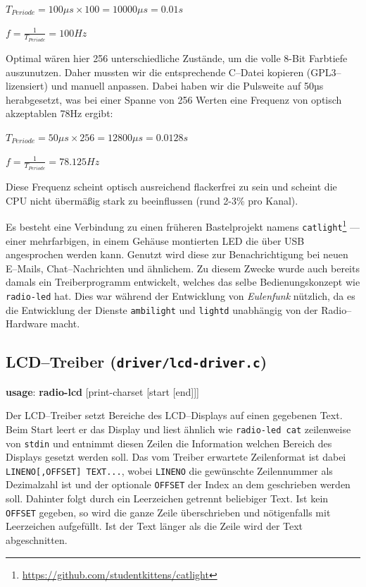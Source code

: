 \documentclass[11pt,ngerman,toc=listof,index=totoc]{scrreprt}
\newenvironment{Shaded}{}{}
\newcommand{\KeywordTok}[1]{\textcolor[rgb]{0.00,0.44,0.13}{\textbf{{#1}}}}
\newcommand{\NormalTok}[1]{{#1}}
\begin{document}
\(T_{Periode} = 100\mu s\times 100= 10000\mu s = 0.01s\)

\(f = \frac{1}{T_{Periode}} = 100Hz\)

Optimal wären hier 256 unterschiedliche Zustände, um die volle 8-Bit
Farbtiefe auszunutzen. Daher mussten wir die entsprechende C--Datei
kopieren (GPL3--lizensiert) und manuell anpassen. Dabei haben wir die
Pulsweite auf 50µs herabgesetzt, was bei einer Spanne von 256 Werten
eine Frequenz von optisch akzeptablen 78Hz ergibt:

\(T_{Periode} = 50\mu s\times 256 = 12800\mu s = 0.0128s\)

\(f = \frac{1}{T_{Periode}} = 78.125Hz\)

Diese Frequenz scheint optisch ausreichend flackerfrei zu sein und
scheint die CPU nicht übermäßig stark zu beeinflussen (rund 2-3\% pro
Kanal).

Es besteht eine Verbindung zu einen früheren Bastelprojekt namens
\texttt{catlight}\footnote{\url{https://github.com/studentkittens/catlight}}
--- einer mehrfarbigen, in einem Gehäuse montierten LED die über USB
angesprochen werden kann. Genutzt wird diese zur Benachrichtigung bei
neuen E--Mails, Chat--Nachrichten und ähnlichem. Zu diesem Zwecke wurde
auch bereits damals ein Treiberprogramm entwickelt, welches das selbe
Bedienungskonzept wie \texttt{radio-led} hat. Dies war während der
Entwicklung von \emph{Eulenfunk} nützlich, da es die Entwicklung der
Dienste \texttt{ambilight} und \texttt{lightd} unabhängig von der
Radio--Hardware macht.

\subsection{\texorpdfstring{LCD--Treiber
(\texttt{driver/lcd-driver.c})}{LCD--Treiber (driver/lcd-driver.c)}}\label{lcdtreiber-driverlcd-driver.c}

\begin{Shaded}
\begin{Highlighting}[]
\KeywordTok{usage}\NormalTok{:}
  \KeywordTok{radio-lcd} \NormalTok{[print-charset [start [end]]]}
\end{Highlighting}
\end{Shaded}

Der LCD--Treiber setzt Bereiche des LCD--Displays auf einen gegebenen
Text. Beim Start leert er das Display und liest ähnlich wie
\texttt{radio-led\ cat} zeilenweise von \texttt{stdin} und entnimmt
diesen Zeilen die Information welchen Bereich des Displays gesetzt
werden soll. Das vom Treiber erwartete Zeilenformat ist dabei
\texttt{LINENO{[},OFFSET{]}\ TEXT...}, wobei \texttt{LINENO} die
gewünschte Zeilennummer als Dezimalzahl ist und der optionale
\texttt{OFFSET} der Index an dem geschrieben werden soll. Dahinter folgt
durch ein Leerzeichen getrennt beliebiger Text. Ist kein \texttt{OFFSET}
gegeben, so wird die ganze Zeile überschrieben und nötigenfalls mit
Leerzeichen aufgefüllt. Ist der Text länger als die Zeile wird der Text
abgeschnitten.
\end{document}
